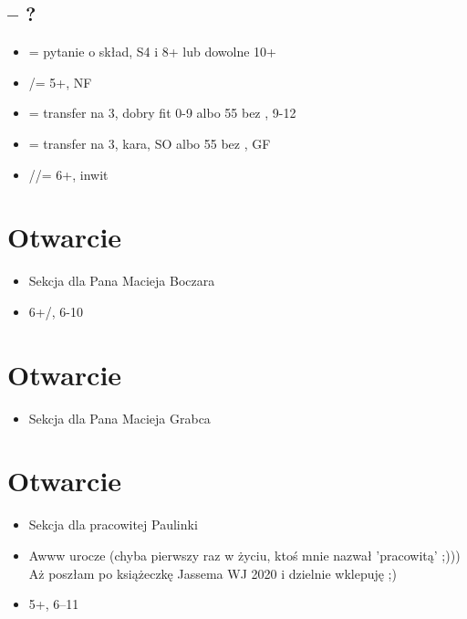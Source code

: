 \documentclass[12pt]{article}
\begin{document}
\subsection{\texorpdfstring{\Cs[2] – ?}{1C – ?}}
\begin{itemize}
    \item \Ds[2] = pytanie o skład, S4 i 8+ lub dowolne 10+
    \item \Hs[2]/\Ss[] = 5+, NF
    \item \NT[2] = transfer na 3\Cs, dobry fit 0-9 albo 55 bez \Cs, 9-12
    \item \Cs[3] = transfer na 3\Ds, kara, SO albo 55 bez \Cs, GF
    \item \Ds[3]/\Hs/\Ss[] = 6+, inwit
\end{itemize}

\newpage
\section{Otwarcie \texorpdfstring{\Ds[2]}{2D}}
\begin{itemize}
    \item Sekcja dla Pana Macieja Boczara
    \item 6+\Hs[]/\Ss[], 6-10
\end{itemize}

\newpage
\section{Otwarcie \texorpdfstring{\Hs[2]}{2H}}
\begin{itemize}
    \item Sekcja dla Pana Macieja Grabca
\end{itemize}

\newpage
\section{Otwarcie \texorpdfstring{\NT[2]}{2NT}}
\begin{itemize}
    \item Sekcja dla pracowitej Paulinki
    \item Awww urocze \Hs \Hs \Hs  (chyba pierwszy raz w życiu, ktoś mnie nazwał 'pracowitą' ;))) Aż poszłam po książeczkę Jassema WJ 2020 i dzielnie wklepuję ;)
    \item 5+\Cs\Ds, 6–11 
\end{itemize}
\end{document}
